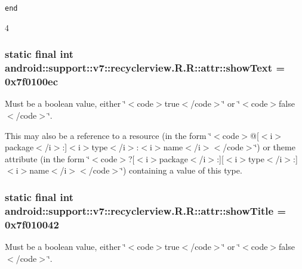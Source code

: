 {\tt end}

4\hypertarget{classandroid_1_1support_1_1v7_1_1recyclerview_1_1_r_1_1attr_340febbd8c8ff19124695033ff537e6f}{
\subsubsection[{showText}]{\setlength{\rightskip}{0pt plus 5cm}static final int android::support::v7::recyclerview.R.R::attr::showText = 0x7f0100ec}}
\label{classandroid_1_1support_1_1v7_1_1recyclerview_1_1_r_1_1attr_340febbd8c8ff19124695033ff537e6f}


Must be a boolean value, either \char`\"{}$<$code$>$true$<$/code$>$\char`\"{} or \char`\"{}$<$code$>$false$<$/code$>$\char`\"{}. 

This may also be a reference to a resource (in the form \char`\"{}$<$code$>$@\mbox{[}$<$i$>$package$<$/i$>$:\mbox{]}$<$i$>$type$<$/i$>$:$<$i$>$name$<$/i$>$$<$/code$>$\char`\"{}) or theme attribute (in the form \char`\"{}$<$code$>$?\mbox{[}$<$i$>$package$<$/i$>$:\mbox{]}\mbox{[}$<$i$>$type$<$/i$>$:\mbox{]}$<$i$>$name$<$/i$>$$<$/code$>$\char`\"{}) containing a value of this type. \hypertarget{classandroid_1_1support_1_1v7_1_1recyclerview_1_1_r_1_1attr_da4b45088744653f30ee7b49cad0b15b}{
\subsubsection[{showTitle}]{\setlength{\rightskip}{0pt plus 5cm}static final int android::support::v7::recyclerview.R.R::attr::showTitle = 0x7f010042}}
\label{classandroid_1_1support_1_1v7_1_1recyclerview_1_1_r_1_1attr_da4b45088744653f30ee7b49cad0b15b}


Must be a boolean value, either \char`\"{}$<$code$>$true$<$/code$>$\char`\"{} or \char`\"{}$<$code$>$false$<$/code$>$\char`\"{}. 

